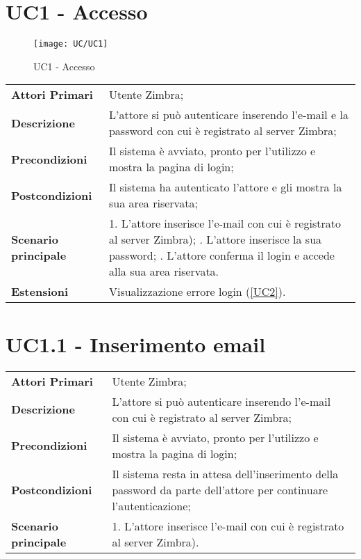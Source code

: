 \section{UC1 - Accesso}
	\begin{figure}[H] 
		\centering
		\texttt{[image: UC/UC1]}
		\caption{UC1 - Accesso}
	\end{figure}
	\begin{center}
	\bgroup
	\def\arraystretch{1.8}     
	\begin{longtable}{  p{4cm} | p{9.5cm} } 
		\textbf{Attori Primari} & Utente Zimbra; \\ 
		\textbf{Descrizione} & L’attore si può autenticare inserendo l'e-mail e la password con cui è registrato al server Zimbra; \\ 
		\textbf{Precondizioni}  & Il sistema è avviato, pronto per l’utilizzo e mostra la pagina di login; \\
		\textbf{Postcondizioni} & Il sistema ha autenticato l’attore e gli mostra la sua area riservata;  \\ 
		\textbf{Scenario principale} & 
			1. L’attore inserisce l'e-mail con cui è registrato al server Zimbra); \newline
			2. L’attore inserisce la sua password; \newline
			3. L’attore conferma il login e accede alla sua area riservata.\\
		\textbf{Estensioni} & Visualizzazione errore login (\ref{UC2}).
	\end{longtable}
	\egroup
\end{center}

\section{UC1.1 - Inserimento email}
	\begin{center}
	\bgroup
	\def\arraystretch{1.8}     
	\begin{longtable}{  p{4cm} | p{9.5cm} } 
		\textbf{Attori Primari} & Utente Zimbra; \\ 
		\textbf{Descrizione} & L’attore si può autenticare inserendo l'e-mail con cui è registrato al server Zimbra; \\ 
		\textbf{Precondizioni}  & Il sistema è avviato, pronto per l’utilizzo e mostra la pagina di login; \\
		\textbf{Postcondizioni} & Il sistema resta in attesa dell'inserimento della password da parte dell'attore per continuare l'autenticazione;  \\ 
		\textbf{Scenario principale} & 
		1. L’attore inserisce l'e-mail con cui è registrato al server Zimbra).
	\end{longtable}
	\egroup
\end{center}
